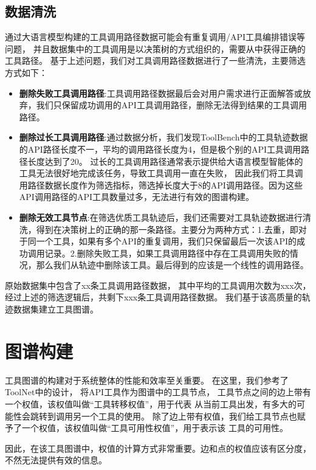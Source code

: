 \subsection{数据清洗}

通过大语言模型构建的工具调用路径数据可能会有重复调用/API工具编排错误等问题，
并且数据集中的工具调用是以决策树的方式组织的，需要从中获得正确的工具路径。
基于上述问题，我们对工具调用路径数据进行了一些清洗，主要筛选方式如下：

\begin{itemize}
  \item \textbf{删除失败工具调用路径}:工具调用路径数据最后会对用户需求进行正面解答或放弃，我们只保留成功调用的API工具调用路径，删除无法得到结果的工具调用路径。
  \item \textbf{删除过长工具调用路径}:通过数据分析，我们发现ToolBench中的工具轨迹数据的API路径长度不一，平均的调用路径长度为4，但是极个别的API工具调用路径长度达到了20。
  过长的工具调用路径通常表示提供给大语言模型智能体的工具无法很好地完成该任务，导致工具调用一直在失败，
  因此我们将工具调用路径数据长度作为筛选指标，筛选掉长度大于8的API调用路径。因为这些API调用路径的API工具数量过多，无法进行有效的图谱构建。
  \item \textbf{删除无效工具节点}:在筛选优质工具轨迹后，我们还需要对工具轨迹数据进行清洗，得到在决策树上的正确的那一条路径。主要分为两种方式：1.去重，即对于同一个工具，如果有多个API的重复调用，我们只保留最后一次该API的成功调用记录。2.删除失败工具，如果工具调用路径中存在工具调用失败的情况，那么我们从轨迹中删除该工具。最后得到的应该是一个线性的调用路径。
\end{itemize}

原始数据集中包含了xx条工具调用路径数据，
其中平均的工具调用次数为xxx次，
经过上述的筛选逻辑后，共剩下xxx条工具调用路径数据。
我们基于该高质量的轨迹数据集建立工具图谱。

\section{图谱构建}

工具图谱的构建对于系统整体的性能和效率至关重要。
在这里，我们参考了ToolNet\cite{Liu2024}中的设计，
将API工具作为图谱中的工具节点，
工具节点之间的边上带有一个权值，该权值叫做“工具转移权值”，用于代表
从当前工具出发，有多大的可能性会跳转到调用另一个工具的使用。
除了边上带有权值，我们给工具节点也赋予了一个权值，该权值叫做“工具可用性权值”，用于表示该
工具的可用性。

因此，在该工具图谱中，权值的计算方式非常重要。边和点的权值应该有区分度，不然无法提供有效的信息。

